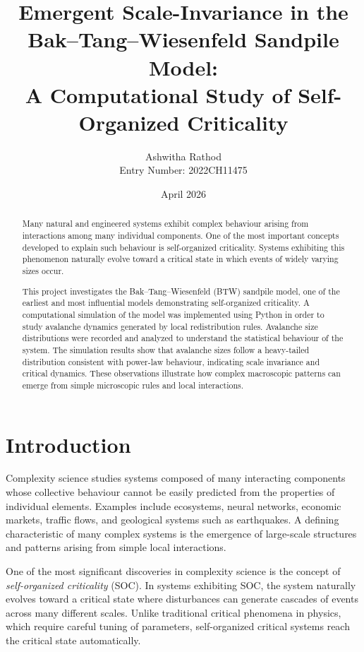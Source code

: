 \documentclass[12pt]{article}
\title{Emergent Scale-Invariance in the Bak--Tang--Wiesenfeld Sandpile Model: \\ 
A Computational Study of Self-Organized Criticality}
\author{
Ashwitha Rathod \\ 
Entry Number: 2022CH11475
}
\date{April 2026}
\begin{document}
\maketitle

\begin{abstract}

Many natural and engineered systems exhibit complex behaviour arising from interactions among many individual components. One of the most important concepts developed to explain such behaviour is self-organized criticality. Systems exhibiting this phenomenon naturally evolve toward a critical state in which events of widely varying sizes occur. 

This project investigates the Bak--Tang--Wiesenfeld (BTW) sandpile model, one of the earliest and most influential models demonstrating self-organized criticality. A computational simulation of the model was implemented using Python in order to study avalanche dynamics generated by local redistribution rules. Avalanche size distributions were recorded and analyzed to understand the statistical behaviour of the system. The simulation results show that avalanche sizes follow a heavy-tailed distribution consistent with power-law behaviour, indicating scale invariance and critical dynamics. These observations illustrate how complex macroscopic patterns can emerge from simple microscopic rules and local interactions.

\end{abstract}

\section{Introduction}

Complexity science studies systems composed of many interacting components whose collective behaviour cannot be easily predicted from the properties of individual elements. Examples include ecosystems, neural networks, economic markets, traffic flows, and geological systems such as earthquakes. A defining characteristic of many complex systems is the emergence of large-scale structures and patterns arising from simple local interactions.

One of the most significant discoveries in complexity science is the concept of \textit{self-organized criticality} (SOC). In systems exhibiting SOC, the system naturally evolves toward a critical state where disturbances can generate cascades of events across many different scales. Unlike traditional critical phenomena in physics, which require careful tuning of parameters, self-organized critical systems reach the critical state automatically.
\end{document}
